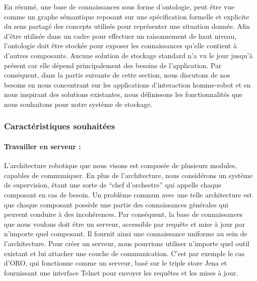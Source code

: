En résumé, une base de connaissances sous forme d'ontologie, peut être vue comme un graphe sémantique reposant sur une spécification formelle et explicite du sens partagé des concepts utilisés pour représenter une situation donnée. Afin d'être utilisée dans un cadre pour effectuer un raisonnement de haut niveau, l'ontologie doit être stockée pour exposer les connaissances qu'elle contient à d'autres composants. Aucune solution de stockage standard n'a vu le jour jusqu'à présent car elle dépend principalement des besoins de l'application. Par conséquent, dans la partie suivante de cette section, nous discutons de nos besoins en nous concentrant sur les applications d'interaction homme-robot et en nous inspirant des solutions existantes, nous définissons les fonctionnalités que nous souhaitons pour notre système de stockage.

\subsubsection*{Caractéristiques souhaitées}

\paragraph{Travailler en serveur :} L'architecture robotique que nous visons est composée de plusieurs modules, capables de communiquer. En plus de l'architecture, nous considérons un système de supervision, étant une sorte de ``chef d'orchestre'' qui appelle chaque composant en cas de besoin. Un problème commun avec une telle architecture est que chaque composant possède une partie des connaissances générales qui peuvent conduire à des incohérences. Par conséquent, la base de connaissances que nous voulons doit être un serveur, accessible par requête et mise à jour par n'importe quel composant. Il fournit ainsi une connaissance uniforme au sein de l'architecture. Pour créer un serveur, nous pourrions utiliser n'importe quel outil existant et lui attacher une couche de communication. C'est par exemple le cas d'ORO, qui fonctionne comme un serveur, basé sur le triple store Jena et fournissant une interface Telnet pour envoyer les requêtes et les mises à jour.

